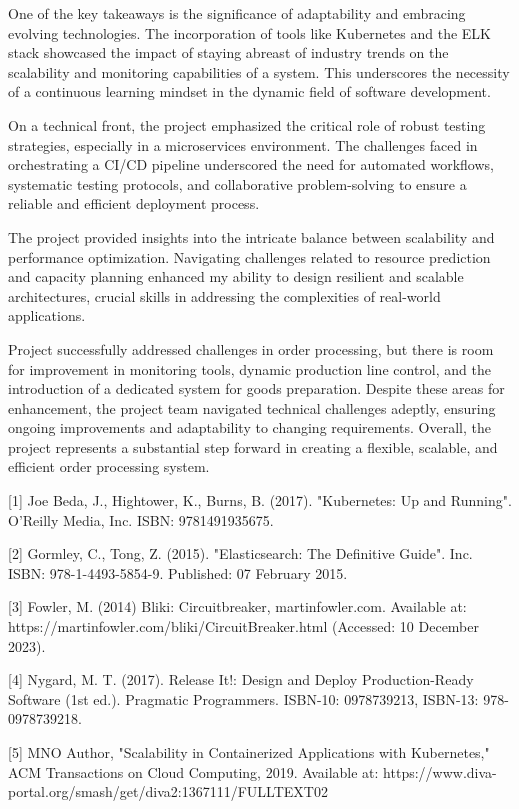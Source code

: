 \documentclass[conference, onecolumn]{IEEEtran}
\begin{document}
One of the key takeaways is the significance of adaptability and embracing evolving technologies. The incorporation of tools like Kubernetes and the ELK stack showcased the impact of staying abreast of industry trends on the scalability and monitoring capabilities of a system. This underscores the necessity of a continuous learning mindset in the dynamic field of software development.

On a technical front, the project emphasized the critical role of robust testing strategies, especially in a microservices environment. The challenges faced in orchestrating a CI/CD pipeline underscored the need for automated workflows, systematic testing protocols, and collaborative problem-solving to ensure a reliable and efficient deployment process.

The project provided insights into the intricate balance between scalability and performance optimization. Navigating challenges related to resource prediction and capacity planning enhanced my ability to design resilient and scalable architectures, crucial skills in addressing the complexities of real-world applications.

Project successfully addressed challenges in order processing, but there is room for improvement in monitoring tools, dynamic production line control, and the introduction of a dedicated system for goods preparation. Despite these areas for enhancement, the project team navigated technical challenges adeptly, ensuring ongoing improvements and adaptability to changing requirements. Overall, the project represents a substantial step forward in creating a flexible, scalable, and efficient order processing system.



[1] Joe Beda, J., Hightower, K., Burns, B. (2017). "Kubernetes: Up and Running". O'Reilly Media, Inc. ISBN: 9781491935675.

[2] Gormley, C., Tong, Z. (2015). "Elasticsearch: The Definitive Guide". Inc. ISBN: 978-1-4493-5854-9. Published: 07 February 2015.

[3] Fowler, M. (2014) Bliki: Circuitbreaker, martinfowler.com. Available at: https://martinfowler.com/bliki/CircuitBreaker.html (Accessed: 10 December 2023). 

[4] Nygard, M. T. (2017). Release It!: Design and Deploy Production-Ready Software (1st ed.). Pragmatic Programmers. ISBN-10: 0978739213, ISBN-13: 978-0978739218.

[5] MNO Author, "Scalability in Containerized Applications with Kubernetes," ACM Transactions on Cloud Computing, 2019. Available at: https://www.diva-portal.org/smash/get/diva2:1367111/FULLTEXT02
\end{document}
